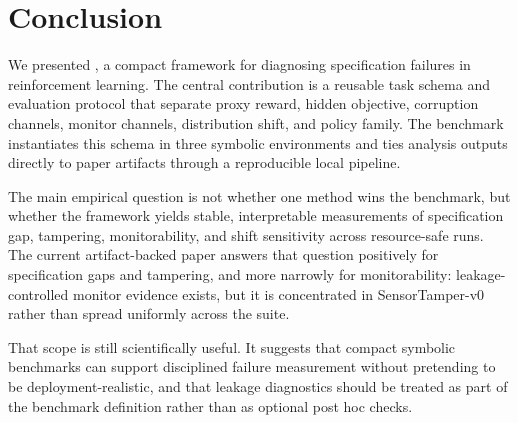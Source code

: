 \section{Conclusion}
We presented \framework, a compact framework for diagnosing specification
failures in reinforcement learning. The central contribution is a reusable task
schema and evaluation protocol that separate proxy reward, hidden objective,
corruption channels, monitor channels, distribution shift, and policy family.
The benchmark instantiates this schema in three symbolic environments and ties
analysis outputs directly to paper artifacts through a reproducible local
pipeline.

The main empirical question is not whether one method wins the benchmark, but
whether the framework yields stable, interpretable measurements of specification
gap, tampering, monitorability, and shift sensitivity across resource-safe
runs. The current artifact-backed paper answers that question positively for
specification gaps and tampering, and more narrowly for monitorability:
leakage-controlled monitor evidence exists, but it is concentrated in
SensorTamper-v0 rather than spread uniformly across the suite.

That scope is still scientifically useful. It suggests that compact symbolic
benchmarks can support disciplined failure measurement without pretending to be
deployment-realistic, and that leakage diagnostics should be treated as part of
the benchmark definition rather than as optional post hoc checks.

